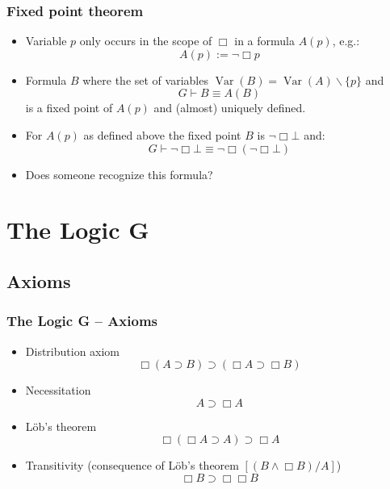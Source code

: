 \documentclass{beamer}
\DeclareMathOperator*{\Var}{Var}
\begin{document}
\begin{frame}
\frametitle{Fixed point theorem\cite{sep-prove}}
\begin{itemize}
\item<+->Variable $p$ only occurs in the scope of $\Box$ in a formula $A(p)$, e.g.:
\begin{equation*}
A(p) := \lnot \Box p
\end{equation*}
\item<+->Formula $B$ where the set of variables $\Var(B) = \Var(A)\smallsetminus\{p\}$ and 
\begin{equation*}
G \vdash B \equiv A(B)
\end{equation*}
is a fixed point of $A(p)$ and (almost) uniquely defined.
\item<+-> For $A(p)$ as defined above the fixed point $B$ is $\lnot \Box \bot$ and:
\begin{equation*}
G\vdash \lnot \Box\bot \equiv  \lnot\Box ( \lnot \Box\bot)
\end{equation*}
\item<+-> Does someone recognize this formula?
\end{itemize}

\end{frame}


\section{The Logic G}
\subsection{Axioms}
\begin{frame}\frametitle{The Logic G -- Axioms}
\begin{itemize}
\item Distribution axiom
\begin{equation*}
\Box(A\supset B) \supset (\Box A \supset \Box B)
\end{equation*}
\item Necessitation
\begin{equation*}
A\supset\Box A
\end{equation*}
\item Löb's theorem
\begin{equation*}
\Box(\Box A \supset A) \supset \Box A 
\end{equation*}
\item Transitivity (consequence of Löb's theorem $\left[(B\land \Box B) / A \right]$)
\begin{equation*}
\Box B \supset \Box \Box B
\end{equation*}
\end{itemize}
\end{frame}
\end{document}
